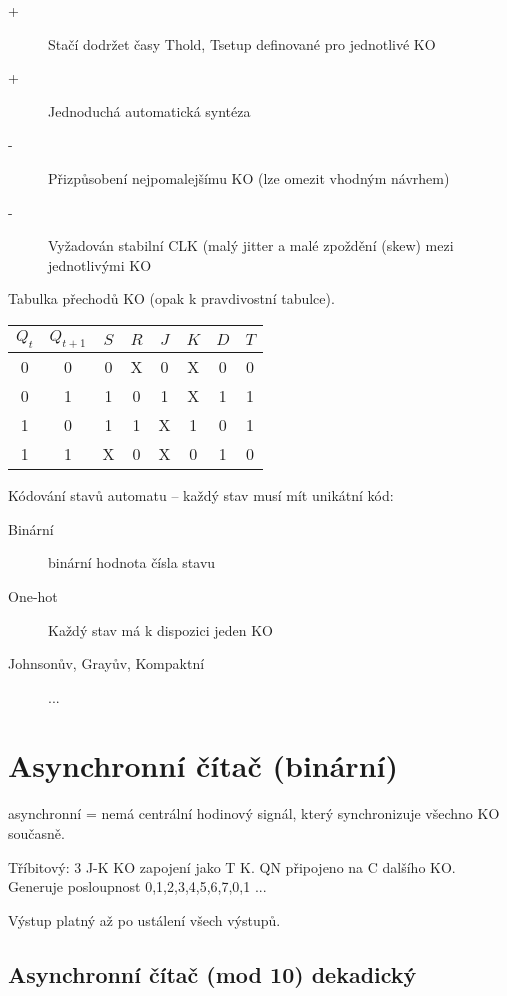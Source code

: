 \documentclass[a4wide]{report}
\begin{document}
\begin{description}
	\item[+] Stačí dodržet časy Thold, Tsetup definované pro jednotlivé KO
	\item[+] Jednoduchá automatická syntéza
	\item[-] Přizpůsobení nejpomalejšímu KO (lze omezit vhodným návrhem)
	\item[-] Vyžadován stabilní CLK (malý jitter a malé zpoždění (skew) mezi jednotlivými KO
\end{description}

Tabulka přechodů KO (opak k pravdivostní tabulce).

\begin{tabular}{| *{2}{c} | *{2}{c} | *{2}{c} | c | c |}
	\hline
	$Q_t$ & $Q_{t+1}$ & $S$ & $R$ & $J$ & $K$ & $D$ & $T$ \\ \hline
	0 & 0 & 0 & X & 0 & X & 0 & 0 \\
	0 & 1 & 1 & 0 & 1 & X & 1 & 1 \\
	1 & 0 & 1 & 1 & X & 1 & 0 & 1 \\
	1 & 1 & X & 0 & X & 0 & 1 & 0 \\
	\hline
\end{tabular}


Kódování stavů automatu -- každý stav musí mít unikátní kód:
\begin{description}
	\item[Binární] binární hodnota čísla stavu
	\item[One-hot] Každý stav má k dispozici jeden KO
	\item[Johnsonův, Grayův, Kompaktní] ...
\end{description}

\section{Asynchronní čítač (binární)}

asynchronní = nemá centrální hodinový signál, který synchronizuje všechno KO současně.

Tříbitový: 3 J-K KO zapojení jako T K. QN připojeno na C dalšího KO. Generuje posloupnost 0,1,2,3,4,5,6,7,0,1 ...

Výstup platný až po ustálení všech výstupů.

\subsection{Asynchronní čítač (mod 10) dekadický}
\end{document}
